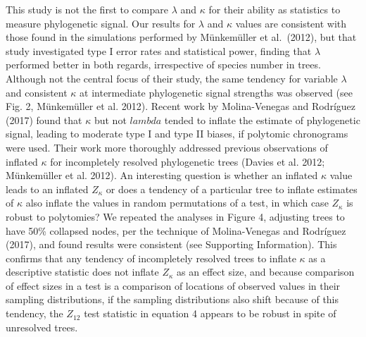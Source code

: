 \documentclass[
]{article}
\begin{document}
This study is not the first to compare \(\lambda\) and \(\kappa\) for
their ability as statistics to measure phylogenetic signal. Our results
for \(\lambda\) and \(\kappa\) values are consistent with those found in
the simulations performed by Münkemüller et al.~(2012), but that study
investigated type I error rates and statistical power, finding that
\(\lambda\) performed better in both regards, irrespective of species
number in trees. Although not the central focus of their study, the same
tendency for variable \(\lambda\) and consistent \(\kappa\) at
intermediate phylogenetic signal strengths was observed (see Fig. 2,
Münkemüller et al. 2012). Recent work by Molina-Venegas and Rodríguez
(2017) found that \(\kappa\) but not \(lambda\) tended to inflate the
estimate of phylogenetic signal, leading to moderate type I and type II
biases, if polytomic chronograms were used. Their work more thoroughly
addressed previous observations of inflated \(\kappa\) for incompletely
resolved phylogenetic trees (Davies et al. 2012; Münkemüller et al.
2012). An interesting question is whether an inflated \(\kappa\) value
leads to an inflated \(Z_\kappa\) or does a tendency of a particular
tree to inflate estimates of \(\kappa\) also inflate the values in
random permutations of a test, in which case \(Z_\kappa\) is robust to
polytomies? We repeated the analyses in Figure 4, adjusting trees to
have 50\% collapsed nodes, per the technique of Molina-Venegas and
Rodríguez (2017), and found results were consistent (see Supporting
Information). This confirms that any tendency of incompletely resolved
trees to inflate \(\kappa\) as a descriptive statistic does not inflate
\(Z_\kappa\) as an effect size, and because comparison of effect sizes
in a test is a comparison of locations of observed values in their
sampling distributions, if the sampling distributions also shift because
of this tendency, the \(Z_{12}\) test statistic in equation 4 appears to
be robust in spite of unresolved trees. \hfill\break  
\end{document}
